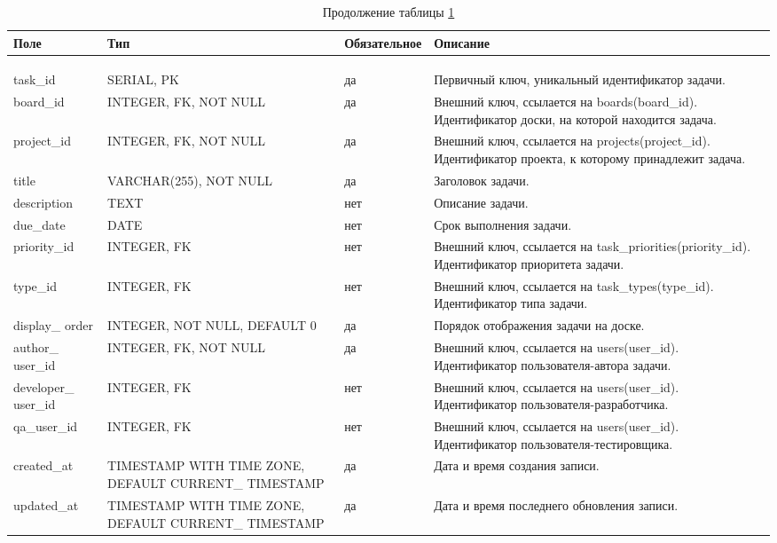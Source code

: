 \begin{xltabular}{\textwidth}{|p{2.5cm}|p{4cm}|p{1.7cm}|X|}
	\caption{Атрибуты сущности «Tasks»\label{tasks:table}}\\ \hline
	\centrow Поле & \centrow Тип & \centrow Обяза\-тельное & \centrow Описание \\ \hline
	 &  &  &  \\ \hline
	\endfirsthead
	\caption*{Продолжение таблицы \ref{tasks:table}} \\ \hline
	 &  &  &  \\ \hline
	\finishhead
	task\_id & SERIAL, PK & \centrow да & Первичный ключ, уникальный идентификатор задачи. \\ \hline
	board\_id & INTEGER, FK, NOT NULL & \centrow да & Внешний ключ, ссылается на boards(board\_id). Идентификатор доски, на которой находится задача. \\ \hline
	project\_id & INTEGER, FK, NOT NULL & \centrow да & Внешний ключ, ссылается на projects(project\_id). Идентификатор проекта, к которому принадлежит задача. \\ \hline
	title & VARCHAR(255), NOT NULL & \centrow да & Заголовок задачи. \\ \hline
	description & TEXT & \centrow нет & Описание задачи. \\ \hline
	due\_date & DATE & \centrow нет & Срок выполнения задачи. \\ \hline
	priority\_id & INTEGER, FK & \centrow нет & Внешний ключ, ссылается на task\_priorities(priority\_id). Идентификатор приоритета задачи. \\ \hline
	type\_id & INTEGER, FK & \centrow нет & Внешний ключ, ссылается на task\_types(type\_id). Идентификатор типа задачи. \\ \hline
	display\_ order & INTEGER, NOT NULL, DEFAULT 0 & \centrow да & Порядок отображения задачи на доске. \\ \hline
	author\_ user\_id & INTEGER, FK, NOT NULL & \centrow да & Внешний ключ, ссылается на users(user\_id). Идентификатор пользователя-автора задачи. \\ \hline
	developer\_ user\_id & INTEGER, FK & \centrow нет & Внешний ключ, ссылается на users(user\_id). Идентификатор пользователя-разработчика. \\ \hline
	qa\_user\_id & INTEGER, FK & \centrow нет & Внешний ключ, ссылается на users(user\_id). Идентификатор пользователя-тестировщика. \\ \hline
	created\_at & TIMESTAMP WITH TIME ZONE, DEFAULT CURRENT\_ TIMESTAMP & \centrow да & Дата и время создания записи. \\ \hline
	updated\_at & TIMESTAMP WITH TIME ZONE, DEFAULT CURRENT\_ TIMESTAMP & \centrow да & Дата и время последнего обновления записи. \\ \hline
\end{xltabular}